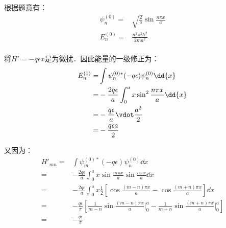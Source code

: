 \subsection{ }
根据题意有：
\begin{equation}
\begin{aligned}
\psi^{(0)}_{n} =& \sqrt{\frac{2}{a}} \sin{\frac{n \pi x}{a}} \\
E^{(0)}_{n} =& \frac{n^{2} \pi^{2} \hbar^{2}}{2ma^{2}} \\
\end{aligned}
\end{equation}

将$H' = -q \epsilon x$是为微扰．因此能量的一级修正为：
\begin{equation}
\begin{aligned}
E^{(1)}_{n} =& \int \psi_{n}^{(0)*} (-q\epsilon) \psi_{n}^{(0)} \dd{x} \\
=& -\frac{2q\epsilon}{a} \int^{a}_{0} x \sin^{2}{\frac{n \pi x}{a}} \dd{x} \\
=& -\frac{q\epsilon}{a} \vdot \frac{a^{2}}{2} \\
=& -\frac{q \epsilon a}{2}
\end{aligned}
\end{equation}

又因为：
\begin{equation}
\begin{aligned}
H'_{mn} =& \int \psi_{m}^{(0)*} (-q\epsilon) \psi_{n}^{(0)} \dd{x} \\
=& -\frac{2q\epsilon}{a} \int^{a}_{0} x \sin{\frac{m \pi x}{a}} \sin{\frac{n \pi x}{a}} \dd{x} \\
=& -\frac{2q\epsilon}{a} \int^{a}_{0} x \frac{1}{2} \left[\cos{\frac{(m-n)\pi x}{a}} - \cos{\frac{(m+n)\pi x}{a}} \right] \dd{x} \\
=& -\frac{q\epsilon}{\pi} \left[\frac{1}{m-n}\sin{\frac{(m-n)\pi x}{a}} \Big|^{a}_{0} - \frac{1}{m+n}\sin{\frac{(m+n)\pi x}{a}} \Big|^{a}_{0} \right] \\
=& -\frac{q\epsilon}{\pi}
\end{aligned}
\end{equation}

